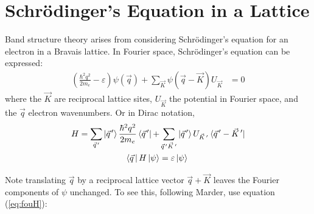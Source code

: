 \documentclass[12pt]{article}
\begin{document}
\section{Schr\"{o}dinger's Equation in a Lattice}
\par Band structure theory arises from considering Schr\"{o}dinger's equation for an electron in a Bravais lattice. 
In Fourier space, Schr\"{o}dinger's equation can be expressed:
\begin{align}
\left( \frac{\hbar^2 q^2}{2 m_e} - \varepsilon \right) \psi (\vec{q}) + \sum_{\vec{K}} \psi(\vec{q}-\vec{K}) U_{\vec{K}} &= 0
\label{eq:fouH}
\end{align}
where the $\vec{K}$ are reciprocal lattice sites, $U_{\vec{K}}$ the potential in Fourier space, and the $\vec{q}$ electron wavenumbers. Or in Dirac notation,
\begin{equation}
\begin{aligned}
H = \sum_{\vec{q}^{\, \prime}} \ket{\vec{q}^{\, \prime}} \frac{\hbar^2 q^2}{2 m_e} \bra{\vec{q}^{\, \prime}} + &\sum_{\vec{q}^{\, \prime} \vec{K}^{\, \prime}} \ket{\vec{q}^{\, \prime}} U_{\vec{K}^{\, \prime}} \bra{\vec{q}^{\, \prime} - \vec{K}^{\, \prime}} \\
\bra{\vec{q}\,}H\ket{\psi} &= \varepsilon \ket{\psi}
\end{aligned}
\label{eq:diracH}
\end{equation}
\par Note translating $\vec{q}$ by a reciprocal lattice vector $\vec{q}+\vec{K}$ leaves the Fourier components of $\psi$ unchanged. To see this, following Marder, use equation (\ref{eq:fouH}):
\end{document}

